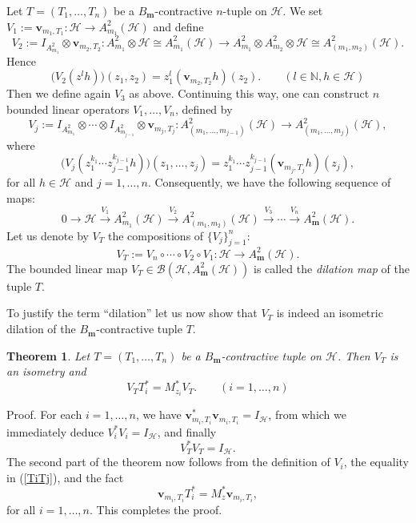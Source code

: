 \documentclass[12pt]{amsart}
\newtheorem{Theorem}{\sc Theorem}[section]
\begin{document}
{\noindent} Let $T = (T_1, \ldots, T_n)$ be a $B_{\bm{m}}$-contractive $n$-tuple
on ${\mathcal{H}}$. We set $V_1 := {\bm{v}}_{m_1, T_1}: {\mathcal{H}} {\rightarrow}
A^2_{m_1}({\mathcal{H}})$ and define
\[V_2 := I_{A^2_{m_1}} \otimes {\bm{v}}_{m_2, T_2} : A^2_{m_1} \otimes
{\mathcal{H}} \cong A^2_{m_1}({\mathcal{H}}) \longrightarrow A^2_{m_1} \otimes
A^2_{m_2} \otimes {\mathcal{H}} \cong A^2_{(m_1, m_2)} ({\mathcal{H}}).\]Hence
\[\Big(V_2(z^l h)\Big)(z_1, z_2) = z_1^l ({\bm{v}}_{m_2, T_2} h)(z_2).
\quad \quad (l \in {\mathbb{N}}, h \in {\mathcal{H}})\] Then we define again $V_3$ as
above. Continuing this way, one can construct $n$ bounded linear
operators $V_1, \ldots, V_n$, defined by \[V_j := I_{A^2_{m_1}}
\otimes \cdots \otimes I_{A^2_{m_{j-1}}} \otimes {\bm{v}}_{m_j, T_j} :
A^2_{(m_1, \ldots, m_{j-1})} ({\mathcal{H}}) \longrightarrow A^2_{(m_1,
\ldots, m_{j})} ({\mathcal{H}}),\]where
\begin{equation}\label{V_j}\Big(V_j(z_1^{k_1} \cdots z_{j-1}^{k_{j-1}} h)\Big)(z_1, \ldots,
z_j) = z_1^{k_1} \cdots z_{j-1}^{k_{j-1}} ({\bm{v}}_{m_j, T_j}
h)(z_j),\end{equation}for all $h \in {\mathcal{H}}$ and $j = 1, \ldots, n$.
Consequently, we have the following sequence of maps:\[0
\longrightarrow {\mathcal{H}} \stackrel{V_1} \longrightarrow A^2_{m_1}({\mathcal{H}})
\stackrel{V_2} \longrightarrow A^2_{(m_1, m_2)}({\mathcal{H}})
\stackrel{V_3}\longrightarrow \cdots \stackrel{V_n}\longrightarrow
A^2_{\bm{m}}({\mathcal{H}}).\]Let us denote by $V_T$ the compositions of
$\{V_j\}_{j=1}^n$: \[V_T := V_n \circ \cdots \circ V_2 \circ V_1 :
{\mathcal{H}} {\rightarrow} A^2_{\bm{m}}({\mathcal{H}}).\]The bounded linear map $V_T \in
{\mathcal{B}}({\mathcal{H}}, A^2_{\bm{m}}({\mathcal{H}}))$ is called the \textit{dilation map} of
the tuple $T$.

To justify the term ``dilation'' let us now show that $V_T$ is
indeed an isometric dilation of the $B_{\bm{m}}$-contractive tuple $T$.

\begin{Theorem}\label{dil1}
Let $T = (T_1, \ldots, T_n)$ be a $B_{\bm{m}}$-contractive tuple on
${\mathcal{H}}$. Then $V_T$ is an isometry and \[V_T T_i^* = M_{z_i}^* V_T.
\quad \quad (i = 1, \ldots, n)\]
\end{Theorem}

{\noindent}\textsf{Proof.} For each $i = 1, \ldots, n$, we have ${\bm{v}}_{m_i,
T_i}^* {\bm{v}}_{m_i, T_i} = I_{\mathcal{H}}$, from which we immediately deduce
$V_i^* V_i = I_{\mathcal{H}}$, and finally
\[V_T^* V_T = I_{\mathcal{H}}.\] The second part of the
theorem now follows from the definition of $V_i$, the equality in
(\ref{TiTj}), and the fact
\[{\bm{v}}_{m_i, T_i} T_i^* = M_{z}^* {\bm{v}}_{m_i, T_i},\]for all $i = 1,
\ldots, n$. This completes the proof. {\hfill \vrule height6pt width 6pt depth 0pt}
\end{document}
